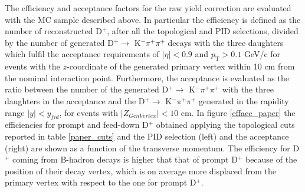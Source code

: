 \documentclass[b5paper,10pt,twoside,oldstyle,classica]{toptesi}
\newcommand{\pt}{p_\text{T}}
\begin{document}
The efficiency and acceptance factors for the raw yield correction are evaluated with the MC sample described above. In particular the efficiency is defined as the number of reconstructed D$^+$, after all the topological and PID selections, divided by the number of generated D$^+\rightarrow$ K$^-\pi^+\pi^+$ decays with the three daughters which fulfil the acceptance requirements of $|\eta| <0.9$ and $\pt > 0.1$ GeV/c for events with the $z$-coordinate of the generated primary vertex within 10 cm from the nominal interaction point. Furthermore, the acceptance is evaluated as the ratio between the number of the generated D$^+\rightarrow$ K$^-\pi^+\pi^+$ with the three daughters in the acceptance and the D$^+\rightarrow$ K$^-\pi^+\pi^+$ generated in the rapidity range $|y| < y_{fid}$, for events with $|Z_{GenVertex}| < 10$ cm. In figure \ref{effacc_paper} the efficiencies for prompt and feed-down D$^+$ obtained applying the topological cuts reported in table \ref{paper_cuts} and the PID selection (left) and the acceptance (right) are shown as a function of the transverse momentum. The efficiency for D$^+$ coming from B-hadron decays is higher that that of prompt D$^+$ because of the position of their decay vertex, which is on average more displaced from the primary vertex with respect to the one for prompt D$^+$. 
\end{document}
